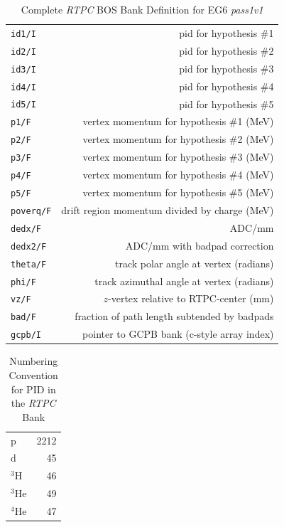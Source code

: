 \documentclass[amsmath,amssymb,notitlepage,12pt]{revtex4-1}
\begin{document}
\begin{table}[thpb]
    \caption{\label{tab:rtpcbank}Complete {\it RTPC} BOS Bank Definition for EG6 {\it pass1v1}}
    \begin{tabular}{p{4cm}r}
    \toprule[1.5pt]
    \texttt{id1/I}        & pid for hypothesis \#1\\
    \texttt{id2/I}        &  pid for hypothesis \#2\\
    \texttt{id3/I}        &  pid for hypothesis \#3\\
    \texttt{id4/I}        &  pid for hypothesis \#4\\
    \texttt{id5/I}        &  pid for hypothesis \#5\\
    \texttt{p1/F}         &  vertex momentum for hypothesis \#1  (MeV)\\
    \texttt{p2/F}         &  vertex momentum for hypothesis \#2  (MeV)\\
    \texttt{p3/F}         &  vertex momentum for hypothesis \#3  (MeV)\\
    \texttt{p4/F}         &  vertex momentum for hypothesis \#4  (MeV)\\
    \texttt{p5/F}         &  vertex momentum for hypothesis \#5  (MeV)\\
    \texttt{poverq/F}     &  drift region momentum divided by charge (MeV)\\
    \texttt{dedx/F}       &  ADC/mm\\
    \texttt{dedx2/F}      &   ADC/mm with badpad correction\\
    \texttt{theta/F}      &   track polar angle at vertex (radians)\\
    \texttt{phi/F}        &   track azimuthal angle at vertex (radians)\\
    \texttt{vz/F}         &   $z$-vertex relative to RTPC-center (mm)\\
    \texttt{bad/F}        &   fraction of path length subtended by badpads\\
    \texttt{gcpb/I}       &   pointer to GCPB bank (c-style array index)\\
    \bottomrule[1.5pt]
\end{tabular}
\end{table}
\begin{table}[thpb]
    \caption{\label{tab:pidconvention}Numbering Convention for PID in the {\em RTPC} Bank}
    \begin{tabular}{p{2cm}r}
    \toprule[1.5pt]
    p & 2212 \\
    d & 45\\
    $^3$H & 46\\
    $^3$He & 49\\
    $^4$He & 47\\
    \bottomrule[1.5pt]
\end{tabular}
\end{table}
\end{document}
